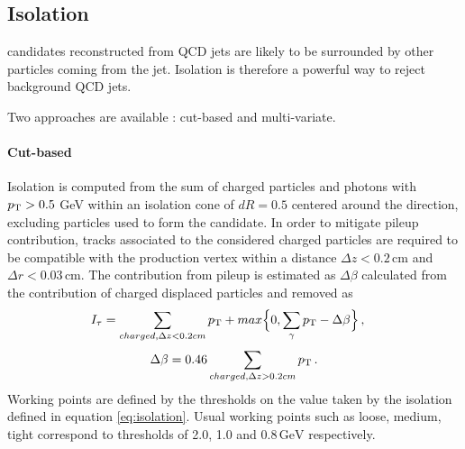 \subsection{Isolation}


\tauh candidates reconstructed from QCD jets are likely to be surrounded by other particles coming from the jet.
Isolation is therefore a powerful way to reject background QCD jets.

Two approaches are available : cut-based and multi-variate.

\paragraph{Cut-based} Isolation is computed from the \pt sum of charged particles and photons with $p_{\mathrm{T}} > 0.5$ GeV within an isolation cone of $dR=0.5$ centered around the \tauh direction, excluding particles used to form the \tauh candidate. In order to mitigate pileup contribution, tracks associated to the considered charged particles are required to be compatible with the \tauh production vertex within a distance $\Delta z < 0.2\,\mathrm{cm}$ and $\Delta r < 0.03\,\mathrm{cm}$. The contribution from pileup is estimated as $\Delta \beta$ calculated from the contribution of charged displaced particles and removed as
\begin{equation}
    I_{\tau} = \sum_{charged, \Delta z<0.2 cm} \pt + max \Big\{ 0, \sum_{\gamma} \pt - \Delta\beta \Big\} \msep
    \label{eq:isolation}
\end{equation}
\begin{equation}
    \Delta \beta = 0.46 \sum_{charged,\Delta z>0.2 cm} \pt \mend
\end{equation}
Working points are defined by the thresholds on the value taken by the isolation defined in equation \ref{eq:isolation}. Usual working points such as loose, medium, tight correspond to thresholds of 2.0, 1.0 and $0.8\,\mathrm{GeV}$ respectively.

